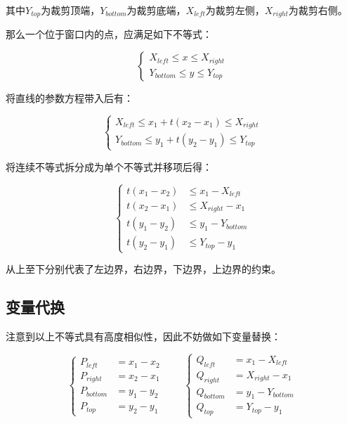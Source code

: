 其中$Y_{top}$为裁剪顶端，$Y_{bottom}$为裁剪底端，$X_{left}$为裁剪左侧，$X_{right}$为裁剪右侧。

那么一个位于窗口内的点，应满足如下不等式：

\begin{equation}
\begin{cases}
X_{left} \leq x \leq X_{right} \\
Y_{bottom} \leq y \leq Y_{top}
\end{cases}
\end{equation}

将直线的参数方程带入后有：

\begin{equation}
\begin{cases}
X_{left} \leq x_1+t(x_2-x_1) \leq X_{right} \\
Y_{bottom} \leq y_1+t(y_2-y_1) \leq Y_{top}
\end{cases}
\end{equation}

将连续不等式拆分成为单个不等式并移项后得：

\begin{equation}
\begin{cases}
t(x_1-x_2 ) & \leq x_1-X_{left} \\
t(x_2-x_1 ) & \leq X_{right}-x_1 \\
t(y_1-y_2 ) & \leq y_1-Y_{bottom} \\
t(y_2-y_1 ) & \leq Y_{top}-y_1
\end{cases}
\end{equation}

从上至下分别代表了左边界，右边界，下边界，上边界的约束。

\subsection{变量代换}

注意到以上不等式具有高度相似性，因此不妨做如下变量替换：

\begin{equation}
\begin{cases}
P_{left} & = x_1-x_2 \\
P_{right} & = x_2-x_1 \\
P_{bottom} & = y_1-y_2 \\
P_{top} & = y_2-y_1
\end{cases}
\qquad
\begin{cases}
Q_{left} & = x_1-X_{left} \\
Q_{right} & = X_{right}-x_1 \\
Q_{bottom} & = y_1-Y_{bottom} \\
Q_{top} & = Y_{top}-y_1
\end{cases}
\end{equation}

